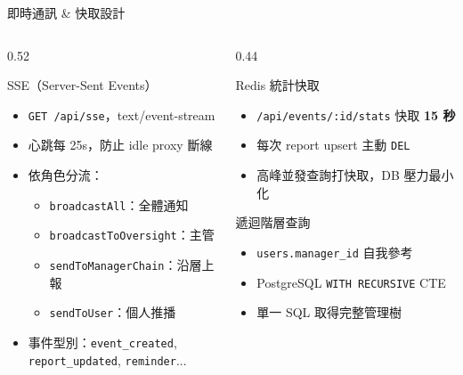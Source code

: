 \documentclass[aspectratio=169,12pt]{beamer}
\begin{document}
\begin{frame}[shrink=12]{即時通訊 \& 快取設計}
\begin{columns}[T,onlytextwidth]
\begin{column}{0.52\textwidth}
  \begin{block}{SSE（Server-Sent Events）}
    \begin{itemize}\small
      \item \texttt{GET /api/sse}，text/event-stream
      \item 心跳每 25s，防止 idle proxy 斷線
      \item 依角色分流：
        \begin{itemize}\scriptsize
          \item \texttt{broadcastAll}：全體通知
          \item \texttt{broadcastToOversight}：主管
          \item \texttt{sendToManagerChain}：沿層上報
          \item \texttt{sendToUser}：個人推播
        \end{itemize}
      \item 事件型別：\texttt{event\_created},\\
        \texttt{report\_updated}, \texttt{reminder}...
    \end{itemize}
  \end{block}
\end{column}
\begin{column}{0.44\textwidth}
  \begin{block}{Redis 統計快取}
    \begin{itemize}\small
      \item \texttt{/api/events/:id/stats} 快取 \textbf{15 秒}
      \item 每次 report upsert \textrightarrow{} 主動 \texttt{DEL}
      \item 高峰並發查詢打快取，DB 壓力最小化
    \end{itemize}
  \end{block}
  \begin{block}{遞迴階層查詢}
    \begin{itemize}\small
      \item \texttt{users.manager\_id} 自我參考
      \item PostgreSQL \texttt{WITH RECURSIVE} CTE
      \item 單一 SQL 取得完整管理樹
    \end{itemize}
  \end{block}
\end{column}
\end{columns}
\end{frame}
\end{document}
